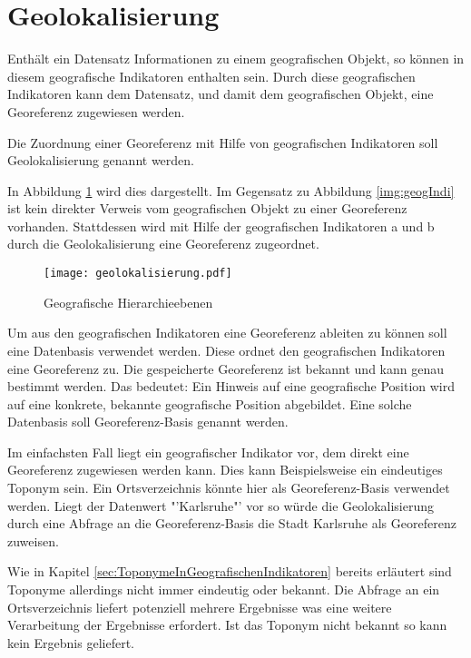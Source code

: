 \section{Geolokalisierung} \label{sec:ueberblick} 

		Enthält ein Datensatz Informationen zu einem geografischen Objekt, so können in diesem geografische Indikatoren enthalten sein.
		Durch diese geografischen Indikatoren kann dem Datensatz, und damit dem geografischen Objekt, eine Georeferenz zugewiesen werden. 

		Die Zuordnung einer Georeferenz mit Hilfe von geografischen Indikatoren soll Geolokalisierung genannt werden.  

		In Abbildung \ref{img:geolokalisierung} wird dies dargestellt.
		Im Gegensatz zu Abbildung \ref{img:geogIndi} ist kein direkter Verweis vom geografischen Objekt zu einer Georeferenz vorhanden. 
		Stattdessen wird mit Hilfe der geografischen Indikatoren a und b durch die Geolokalisierung eine Georeferenz zugeordnet.

		\begin{figure}[!ht]
		\begin{center}
		\texttt{[image: geolokalisierung.pdf]}
		\caption{Geografische Hierarchieebenen}
		\label{img:geolokalisierung}
		\end{center}
		\end{figure}	

		Um aus den geografischen Indikatoren eine Georeferenz ableiten zu können soll eine Datenbasis verwendet werden.
		Diese ordnet den geografischen Indikatoren eine Georeferenz zu.
		Die gespeicherte Georeferenz ist bekannt und kann genau bestimmt werden. 
		Das bedeutet: Ein Hinweis auf eine geografische Position wird auf eine konkrete, bekannte geografische Position abgebildet.
		Eine solche Datenbasis soll Georeferenz-Basis genannt werden.  

		Im einfachsten Fall liegt ein geografischer Indikator vor, dem direkt eine Georeferenz zugewiesen werden kann.
		Dies kann Beispielsweise ein eindeutiges Toponym sein.	
		Ein Ortsverzeichnis könnte hier als Georeferenz-Basis verwendet werden.
		Liegt der Datenwert "'Karlsruhe"' vor so würde die Geolokalisierung durch eine Abfrage an die Georeferenz-Basis die Stadt Karlsruhe als Georeferenz zuweisen.

		Wie in Kapitel \ref{sec:ToponymeInGeografischenIndikatoren} bereits erläutert sind Toponyme allerdings nicht immer eindeutig oder bekannt. 
		Die Abfrage an ein Ortsverzeichnis liefert potenziell mehrere Ergebnisse was eine weitere Verarbeitung der Ergebnisse erfordert.
		Ist das Toponym nicht bekannt so kann kein Ergebnis geliefert.

